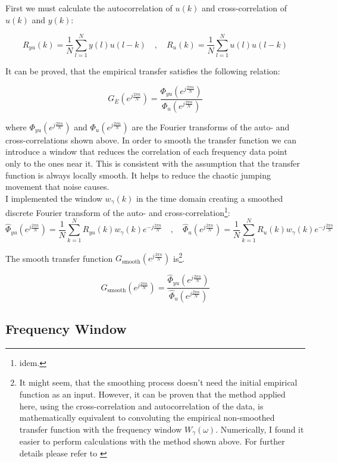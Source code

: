 First we must calculate the autocorrelation of $u(k)$ and cross-correlation of $u(k)$ and $y(k)$:

\[R_{yu}(k) = \frac{1}{N}\sum\limits_{l = 1}^N y(l)u(l-k) \quad , \quad R_{u}(k) = \frac{1}{N}\sum\limits_{l = 1}^N u(l)u(l-k)\]

It can be proved, that the empirical transfer satisfies the following relation: 

\[G_E(e^{j\frac{2\pi n}{N}}) = \frac{\Phi_{yu}(e^{j\frac{2\pi n}{N}})}{\Phi_{u}(e^{j\frac{2\pi n}{N}})}\]

where $\Phi_{yu}(e^{j\frac{2\pi n}{N}})$ and $\Phi_{u}(e^{j\frac{2\pi n}{N}})$ are the Fourier transforms of the auto- and cross-correlations shown above. In order to smooth the transfer function we can introduce a window that reduces the correlation of each frequency data point only to the ones near it. This is consistent with the assumption that the transfer function is always locally smooth. It helps to reduce the chaotic jumping movement that noise causes. \\

I implemented the window $w_\gamma(k)$ in the time domain creating a smoothed discrete Fourier transform of the auto- and cross-correlation\footnote[3]{idem.}:
\[\hat{\Phi}_{yu}(e^{j\frac{2\pi n}{N}}) = \frac{1}{N}\sum\limits_{k = 1}^{N }R_{yu}(k)w_\gamma(k)e^{-j\frac{2\pi n}{N}} \quad, \quad \hat{\Phi}_{u}(e^{j\frac{2\pi n}{N}}) = \frac{1}{N}\sum\limits_{k = 1}^{N }R_{u}(k)w_\gamma(k)e^{-j\frac{2\pi n}{N}}\]

The smooth transfer function $G_\text{smooth}(e^{j\frac{2\pi n}{N}})$ is\footnote[4]{It might seem, that the smoothing process doesn't need the initial empirical function as an input. However, it can be proven that the method applied here, using the cross-correlation and autocorrelation of the data, is mathematically equivalent to convoluting the empirical non-smoothed transfer function with the frequency window $W_\gamma(\omega)$. Numerically, I found it easier to perform calculations with the method shown above. For further details please refer to \cite{ljung1999system}}.


\[G_\text{smooth}(e^{j\frac{2\pi n}{N}}) = \frac{\hat{\Phi}_{yu}(e^{j\frac{2\pi n}{N}})}{\hat{\Phi}_{u}(e^{j\frac{2\pi n}{N}})}\]


\subsection{Frequency Window}

